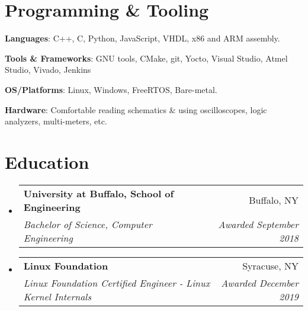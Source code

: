 \documentclass[letterpaper,11pt]{article}
\makeatletter
\newcommand{\resumeSubheading}[4]{
  \vspace{-1pt}\item
    \begin{tabular*}{0.97\textwidth}{l@{\extracolsep{\fill}}r}
      \textbf{#1} & #2 \\
      \textit{\small#3} & \textit{\small #4} \\
    \end{tabular*}\vspace{-5pt}
}
\newcommand{\resumeSubHeadingListStart}{\begin{itemize}[leftmargin=*]}
\newcommand{\resumeSubHeadingListEnd}{\end{itemize}}
\makeatother
\begin{document}
%
\section{Programming \& Tooling}
 \resumeSubHeadingListStart
   \item{
     \textbf{Languages}{: C++, C, Python, JavaScript, VHDL, x86 and ARM assembly.} }
     \hfill
     \item{
      \textbf{Tools \& Frameworks}{: GNU tools, CMake, git, Yocto, Visual Studio, Atmel Studio, Vivado, Jenkins
   } 
\item{
	\textbf{OS/Platforms}{: Linux, Windows, FreeRTOS, Bare-metal.} }
\item {
	\textbf{Hardware}{: Comfortable reading schematics \& using oscilloscopes, logic analyzers, multi-meters, etc.}}

\iffalse
	\item{\textbf{Notable Courses}{: Operating Systems, Machine Learning, Computer Vision, Hardware-Software Integration} }
\fi
} 
 \resumeSubHeadingListEnd
 
 \section{Education}
 \resumeSubHeadingListStart
 \resumeSubheading
 {University at Buffalo, School of Engineering}{Buffalo, NY}
 {Bachelor of Science, Computer Engineering}{Awarded September 2018}
  \resumeSubheading
 {Linux Foundation}{Syracuse, NY}
 {Linux Foundation Certified Engineer - Linux Kernel Internals}{Awarded December 2019}
 \resumeSubHeadingListEnd
 
 


\end{document}
